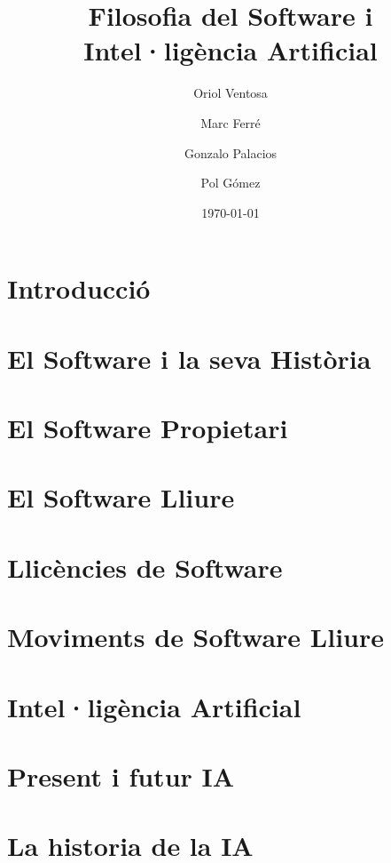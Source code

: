 \documentclass[a4paper,12pt]{report}
\begin{document}


\title{
	{\bf Filosofia del Software i Intel·ligència Artificial}
}
\author{
	Oriol Ventosa \and
	Marc Ferré \and
	Gonzalo Palacios \and
	Pol Gómez
}
\date{\today}
\maketitle

\tableofcontents

\chapter{Introducció}


\chapter{El Software i la seva Història}


\chapter{El Software Propietari}


\chapter{El Software Lliure}


\chapter{Llicències de Software}


\chapter{Moviments de Software Lliure}


\chapter{Intel·ligència Artificial}


\chapter{Present i futur IA}


\chapter{La historia de la IA}




\end{document}
